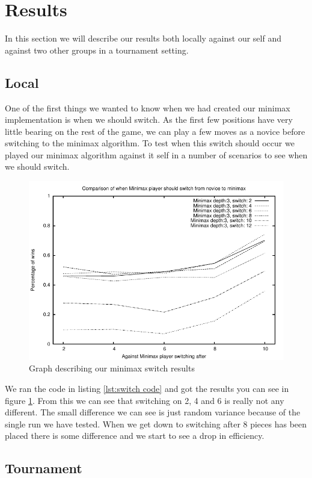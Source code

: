 \section{Results}\label{results}
In this section we will describe our results both locally against our self and
against two other groups in a tournament setting.

\subsection{Local}\label{results:local}
One of the first things we wanted to know when we had created our minimax 
implementation is when we should switch. As the first few positions have very
little bearing on the rest of the game, we can play a few moves as a novice
before switching to the minimax algorithm. To test when this switch should
occur we played our minimax algorithm against it self in a number of scenarios
to see when we should switch. 

\begin{figure}
	\includegraphics{graphs/switch.pdf}
	\caption[Minimax switch graph]{Graph describing our minimax switch results}
	\label{fig:minimax switch}
\end{figure}

We ran the code in listing \ref{lst:switch code} and got the results you can see in figure
\ref{fig:minimax switch}. From this we can see that switching on 2, 4 and 6 is 
really not any different.
The small difference we can see is just random variance because of the single
run we have tested. When we get down to switching after 8 pieces has been placed
there is some difference and we start to see a drop in efficiency.

\subsection{Tournament}\label{results:tournament}


